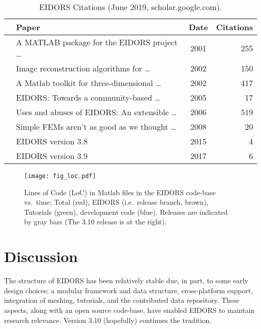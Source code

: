 \documentclass[10pt,letterpaper]{article}
\begin{document}
\begin{table}[H]
  \footnotesize
\centering
\caption{\label{tbl:cite} EIDORS Citations
 (June 2019, scholar.google.com).
}
\begin{tabular}{r@{\hspace{1mm}}lcr}
  \toprule
  & Paper & Date & \hspace{-2mm}Citations \\
  \midrule
  \cite{vauhkonen2001} & A MATLAB package for the EIDORS project \ldots\hspace{-5mm}  
    & 2001 & 255 \\
  \cite{polydorides2002phd} & Image reconstruction algorithms for \ldots
    & 2002 & 150 \\
  \cite{polydorides2002matlab} & A Matlab toolkit for three-dimensional \ldots
    & 2002 & 417 \\
  \cite{adler2005} & EIDORS: Towards a community-based \ldots
    & 2005 & 17 \\
  \cite{adler2006} & Uses and abuses of {EIDORS}: An extensible \ldots
    & 2006 & 519 \\
  \cite{adler2008} & Simple FEMs aren't as good as we thought \ldots
    & 2008 &  20 \\
  \cite{adler2015} & EIDORS version 3.8
    & 2015 & 4 \\
  \cite{adler2017} & EIDORS version 3.9
    & 2017 & 6 \\
  \bottomrule
\end{tabular}
\vspace{-1em}
\end{table}

\begin{figure}[H]
  \vspace{-2.5mm}
\centering
 \texttt{[image: fig\_loc.pdf]}
\caption{\label{fig:loc}%
  Lines of Code (LoC) in Matlab files in the EIDORS code-base vs.\ time; Total
   (red), EIDORS (i.e.\ release branch, brown), Tutorials (green), development code (blue).
   Releases are indicated by gray bars (The 3.10 release is
   at the right).
}
\end{figure}

\section{Discussion}
The structure of EIDORS has been relatively stable due, in part, to some early design choices:
a modular framework and data structure,
cross-platform support, integration of meshing,
tutorials, and the contributed data repository.
These aspects, along with an open source code-base, have enabled EIDORS to
maintain research relevance.
Version 3.10 (hopefully) continues the tradition.
\end{document}
